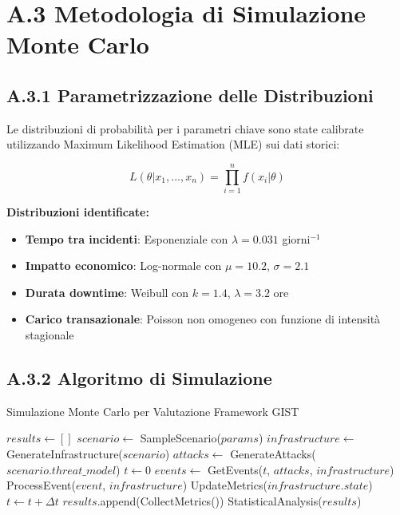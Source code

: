\section{A.3 Metodologia di Simulazione Monte Carlo}

\subsection{A.3.1 Parametrizzazione delle Distribuzioni}

Le distribuzioni di probabilità per i parametri chiave sono state calibrate utilizzando Maximum Likelihood Estimation (MLE) sui dati storici:

\begin{equation}
L(\theta|x_1,...,x_n) = \prod_{i=1}^{n} f(x_i|\theta)
\end{equation}

\textbf{Distribuzioni identificate:}
\begin{itemize}
    \item \textbf{Tempo tra incidenti}: Esponenziale con $\lambda = 0.031$ giorni$^{-1}$
    \item \textbf{Impatto economico}: Log-normale con $\mu = 10.2$, $\sigma = 2.1$
    \item \textbf{Durata downtime}: Weibull con $k = 1.4$, $\lambda = 3.2$ ore
    \item \textbf{Carico transazionale}: Poisson non omogeneo con funzione di intensità stagionale
\end{itemize}

\subsection{A.3.2 Algoritmo di Simulazione}

\begin{algorithm}
\caption{Simulazione Monte Carlo per Valutazione Framework GIST}
\begin{algorithmic}[1]
    \State $results \gets []$
        \State $scenario \gets$ SampleScenario($params$)
        \State $infrastructure \gets$ GenerateInfrastructure($scenario$)
        \State $attacks \gets$ GenerateAttacks($scenario.threat\_model$)
        \State $t \gets 0$
            \State $events \gets$ GetEvents($t$, $attacks$, $infrastructure$)
                \State ProcessEvent($event$, $infrastructure$)
                \State UpdateMetrics($infrastructure.state$)
            \EndFor
            \State $t \gets t + \Delta t$
        \EndWhile
        \State $results$.append(CollectMetrics())
    \EndFor
    \State \Return StatisticalAnalysis($results$)
\EndProcedure
\end{algorithmic}
\end{algorithm}

